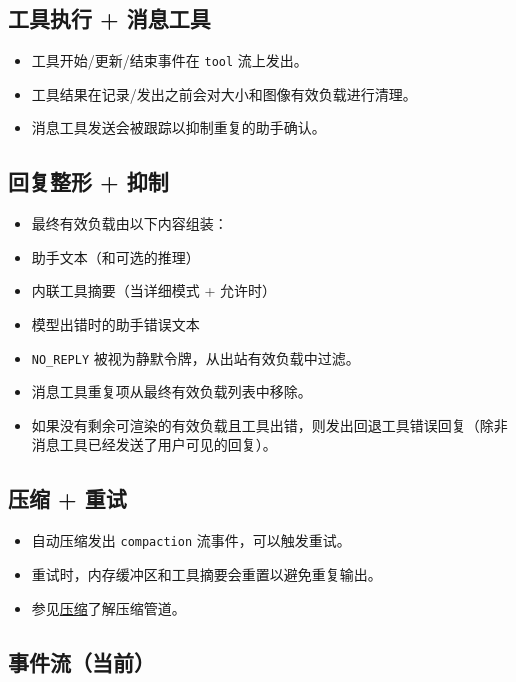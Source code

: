 \subsection{工具执行 + 消息工具}


\begin{itemize}
  \item 工具开始/更新/结束事件在 \texttt{tool} 流上发出。
  \item 工具结果在记录/发出之前会对大小和图像有效负载进行清理。
  \item 消息工具发送会被跟踪以抑制重复的助手确认。
\end{itemize}


\subsection{回复整形 + 抑制}


\begin{itemize}
  \item 最终有效负载由以下内容组装：
  \item 助手文本（和可选的推理）
  \item 内联工具摘要（当详细模式 + 允许时）
  \item 模型出错时的助手错误文本
  \item \texttt{NO\_REPLY} 被视为静默令牌，从出站有效负载中过滤。
  \item 消息工具重复项从最终有效负载列表中移除。
  \item 如果没有剩余可渲染的有效负载且工具出错，则发出回退工具错误回复（除非消息工具已经发送了用户可见的回复）。
\end{itemize}


\subsection{压缩 + 重试}


\begin{itemize}
  \item 自动压缩发出 \texttt{compaction} 流事件，可以触发重试。
  \item 重试时，内存缓冲区和工具摘要会重置以避免重复输出。
  \item 参见\href{/concepts/compaction}{压缩}了解压缩管道。
\end{itemize}


\subsection{事件流（当前）}


